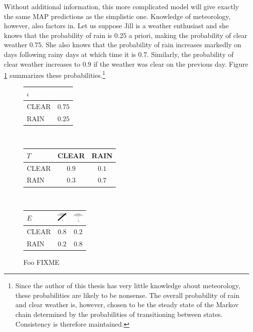 Without additional information, this more complicated model will give
exactly the same MAP predictions as the simplistic one. Knowledge of
meteorology, however, also factors in. Let us suppose Jill is a
weather enthusiast and she knows that the probability of rain is
$0.25$ a priori, making the probability of clear weather $0.75$. She also knows
that the probability of rain increases markedly on days following
rainy days at which time it is $0.7$.  Similarly, the probability of
clear weather increases to $0.9$ if the weather was clear on the
previous day. Figure \ref{hmm-ex-1} summarizes these
probabilities.\footnote{Since the author of this thesis has very
  little knowledge about meteorology, these probabilities are likely
  to be nonsense. The overall probability of rain and clear weather
  is, however, chosen to be the steady state of the Markov chain
  determined by the probabilities of transitioning between
  states. Consistency is therefore maintained.}

\begin{figure}[!htb]
\begin{center}
\begin{tabular}{|l|c|}
\hline
   $\iota$   &       \\
\hline
CLEAR  & $0.75$ \\
RAIN  & $0.25$ \\
\hline
\end{tabular}~~~
\begin{tabular}{|l|cc|}
\hline
   $T$   & CLEAR & RAIN  \\
\hline
CLEAR  & $0.9$ & $0.1$ \\
RAIN   & $0.3$ & $0.7$ \\
\hline
\end{tabular}~~~
\begin{tabular}{|l|cc|}
\hline
   $E$   & \includegraphics[width=0.5cm]{no_umbrella} & \includegraphics[width=0.5cm]{umbrella} \\
\hline
CLEAR   & $0.8$ &  $0.2$         \\
RAIN    & $0.2$ &  $0.8$         \\
\hline
\end{tabular}
\end{center}
\caption{Foo FIXME}\label{hmm-ex-1}
\end{figure}

